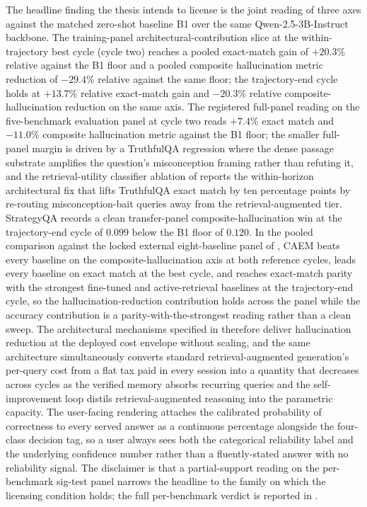 The headline finding the thesis intends to license is the joint reading of three axes against the matched zero-shot baseline B1 over the same Qwen-2.5-3B-Instruct backbone. The training-panel architectural-contribution slice at the within-trajectory best cycle (cycle two) reaches a pooled exact-match gain of $+20.3\%$ relative against the B1 floor and a pooled composite hallucination metric reduction of $-29.4\%$ relative against the same floor; the trajectory-end cycle holds at $+13.7\%$ relative exact-match gain and $-20.3\%$ relative composite-hallucination reduction on the same axis. The registered full-panel reading on the five-benchmark evaluation panel at cycle two reads $+7.4\%$ exact match and $-11.0\%$ composite hallucination metric against the B1 floor; the smaller full-panel margin is driven by a TruthfulQA regression where the dense passage substrate amplifies the question's misconception framing rather than refuting it, and the retrieval-utility classifier ablation of  reports the within-horizon architectural fix that lifts TruthfulQA exact match by ten percentage points by re-routing misconception-bait queries away from the retrieval-augmented tier. StrategyQA records a clean transfer-panel composite-hallucination win at the trajectory-end cycle of $0.099$ below the B1 floor of $0.120$. In the pooled comparison against the locked external eight-baseline panel of , CAEM beats every baseline on the composite-hallucination axis at both reference cycles, leads every baseline on exact match at the best cycle, and reaches exact-match parity with the strongest fine-tuned and active-retrieval baselines at the trajectory-end cycle, so the hallucination-reduction contribution holds across the panel while the accuracy contribution is a parity-with-the-strongest reading rather than a clean sweep. The architectural mechanisms specified in  therefore deliver hallucination reduction at the deployed cost envelope without scaling, and the same architecture simultaneously converts standard retrieval-augmented generation's per-query cost from a flat tax paid in every session into a quantity that decreases across cycles as the verified memory absorbs recurring queries and the self-improvement loop distils retrieval-augmented reasoning into the parametric capacity. The user-facing rendering attaches the calibrated probability of correctness to every served answer as a continuous percentage alongside the four-class decision tag, so a user always sees both the categorical reliability label and the underlying confidence number rather than a fluently-stated answer with no reliability signal. The disclaimer is that a partial-support reading on the per-benchmark sig-test panel narrows the headline to the family on which the licensing condition holds; the full per-benchmark verdict is reported in .

